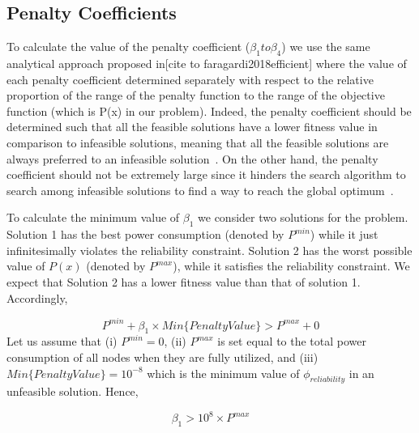 \subsection{Penalty Coefficients}
\label{sec:penaltycoefficient}
To calculate the value of the penalty coefficient ($\beta_1 to \beta_4$) we use the same analytical approach proposed in[cite to faragardi2018efficient]
where the value of each penalty coefficient determined separately with respect to the relative proportion of the range of the penalty function to the range of the objective function (which is P(x) in our problem). Indeed, the penalty coefficient should be determined such that all the feasible solutions have a lower fitness value in comparison to infeasible solutions, meaning that all the feasible solutions are always preferred to an infeasible solution~\cite{faragardi2018JSS}. On the other hand, the penalty coefficient should not be extremely large since it hinders the search algorithm to search among infeasible solutions to find a way to reach the global optimum~\cite{talbi2009metaheuristics}.

To calculate the minimum value of $\beta_1$ we consider two solutions for the problem. Solution 1 has the best power consumption (denoted by $P^{min}$) while it just infinitesimally violates the reliability constraint. Solution 2 has the worst possible value of $P(x)$ (denoted by $P^{max}$), while it satisfies the reliability constraint. We expect that Solution 2 has a lower fitness value than that of solution 1. Accordingly,

\begin{equation}
\label{eq:PnelatyMem1}
P^{min} + \beta_1 \times Min\{Penalty Value\} > P^{max} + 0
\end{equation}  
Let us assume that (i) $P^{min} = 0$, (ii) $P^{max}$ is set equal to the total power consumption of all nodes when they are fully utilized, and (iii) $Min\{Penalty Value\} = 10^{-8}$ which is the minimum value of $\phi_{reliability}$ in an unfeasible solution. Hence,

\begin{equation}
\label{eq:PnelatyMem2}
\beta_1 > 10^8 \times P^{max}
\end{equation}  

